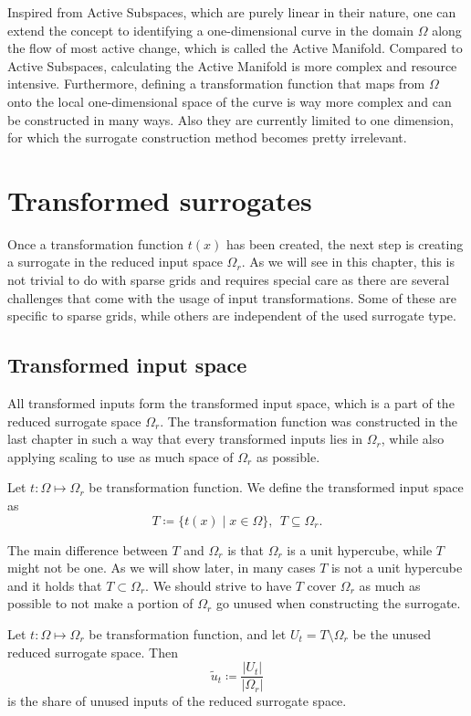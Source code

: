 \documentclass[
  a4paper,  %
  twoside,  %
  bibliography=totoc,
  headsepline,
  cleardoublepage=empty,
  parskip=half,
  draft=false
]{scrbook}
\begin{document}
Inspired from Active Subspaces, which are purely linear in their nature, one can extend the concept to identifying a one-dimensional curve in the domain $\Omega$ along the flow of most active change, which is called the Active Manifold.
Compared to Active Subspaces, calculating the Active Manifold is more complex and resource intensive.
Furthermore, defining a transformation function that maps from $\Omega$ onto the local one-dimensional space of the curve is way more complex and can be constructed in many ways.
Also they are currently limited to one dimension, for which the surrogate construction method becomes pretty irrelevant.


\chapter{Transformed surrogates}
\label{chap:c4}

Once a transformation function $t(x)$ has been created, the next step is creating a surrogate in the reduced input space $\Omega_r$.
As we will see in this chapter, this is not trivial to do with sparse grids and requires special care as there are several challenges that come with the usage of input transformations.
Some of these are specific to sparse grids, while others are independent of the used surrogate type.

\section{Transformed input space}

All transformed inputs form the transformed input space, which is a part of the reduced surrogate space $\Omega_r$.
The transformation function was constructed in the last chapter in such a way that every transformed inputs lies in $\Omega_r$, while also applying scaling to use as much space of $\Omega_r$ as possible.
\begin{definition}
Let $t \colon \Omega \mapsto \Omega_r$ be transformation function.
We define the transformed input space as
\begin{equation}
T \coloneqq \{t(x) \mid x \in\Omega\}, ~~ T \subseteq \Omega_r.
\end{equation}
\end{definition}
The main difference between $T$ and $\Omega_r$ is that $\Omega_r$ is a unit hypercube, while $T$ might not be one.
As we will show later, in many cases $T$ is not a unit hypercube and it holds that $T \subset \Omega_r$.
We should strive to have $T$ cover $\Omega_r$ as much as possible to not make a portion of $\Omega_r$ go unused when constructing the surrogate.
\begin{definition}
Let $t \colon \Omega \mapsto \Omega_r$ be transformation function, and let $U_t=T \setminus \Omega_r$ be the unused reduced surrogate space.
Then
\begin{equation}
\tilde{u}_t \coloneqq \frac{|U_t|}{|\Omega_r|}
\end{equation}
is the share of unused inputs of the reduced surrogate space.
\end{definition}
\end{document}
